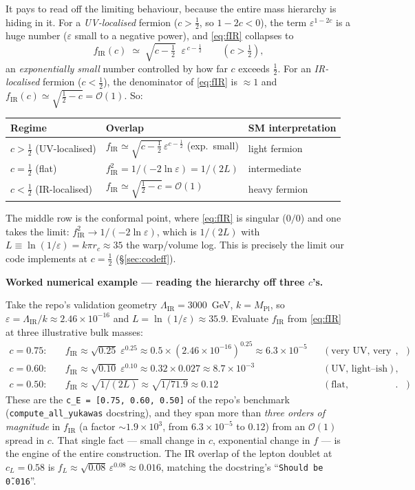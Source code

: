 \documentclass[11pt]{article}
\newenvironment{callout}[1]{%
  \par\medskip\begin{shaded}\noindent\textbf{#1}\par\smallskip}{\end{shaded}\medskip}
\newcommand{\LIR}{\Lambda_{\mathrm{IR}}}
\newcommand{\half}{\tfrac{1}{2}}
\newcommand{\eps}{\varepsilon}
\newcommand{\fIR}{f_{\mathrm{IR}}}
\newcommand{\Mpl}{M_{\mathrm{Pl}}}
\newcommand{\code}[1]{\texttt{#1}}
\theoremstyle{definition}
\begin{document}
It pays to read off the limiting behaviour, because the entire mass hierarchy is
hiding in it. For a \emph{UV-localised} fermion ($c>\half$, so $1-2c<0$), the term
$\eps^{1-2c}$ is a huge number ($\eps$ small to a negative power), and
\eqref{eq:fIR} collapses to
\begin{equation}
\fIR(c)\;\simeq\;\sqrt{c-\half}\;\;\eps^{\,c-\half}\qquad (c>\half),
\label{eq:fIRlimit}
\end{equation}
an \emph{exponentially small} number controlled by how far $c$ exceeds $\half$.
For an \emph{IR-localised} fermion ($c<\half$), the denominator of \eqref{eq:fIR}
is $\approx 1$ and $\fIR(c)\simeq\sqrt{\half-c}=\mathcal{O}(1)$. So:
\begin{center}
\begin{tabular}{lll}
\toprule
Regime & Overlap & SM interpretation \\
\midrule
$c>\half$ (UV-localised) & $\fIR\simeq\sqrt{c-\half}\,\eps^{c-\half}$ (exp.\ small) & light fermion \\
$c=\half$ (flat) & $\fIR^2 = 1/(-2\ln\eps) = 1/(2L)$ & intermediate \\
$c<\half$ (IR-localised) & $\fIR\simeq\sqrt{\half-c}=\mathcal{O}(1)$ & heavy fermion \\
\bottomrule
\end{tabular}
\end{center}
The middle row is the conformal point, where \eqref{eq:fIR} is singular ($0/0$)
and one takes the limit: $\fIR^2\to 1/(-2\ln\eps)$, which is $1/(2L)$ with
$L\equiv\ln(1/\eps)=k\pi r_c\approx 35$ the warp/volume log. This is precisely the
limit our code implements at $c=\half$ (\S\ref{sec:codeff}).

\begin{callout}{Worked numerical example --- reading the hierarchy off three $c$'s.}
Take the repo's validation geometry $\LIR=3000$~GeV, $k=\Mpl$, so
$\eps=\LIR/k\approx2.46\times10^{-16}$ and $L=\ln(1/\eps)\approx35.9$. Evaluate
$\fIR$ from \eqref{eq:fIR} at three illustrative bulk masses:
\begin{align*}
c=0.75:&\quad \fIR \approx \sqrt{0.25}\;\eps^{0.25}\approx 0.5\times(2.46\times10^{-16})^{0.25}\approx 6.3\times10^{-5}
   &&(\text{very UV, very light}),\\
c=0.60:&\quad \fIR \approx \sqrt{0.10}\;\eps^{0.10}\approx 0.32\times 0.027 \approx 8.7\times10^{-3}
   &&(\text{UV, light--ish}),\\
c=0.50:&\quad \fIR \approx \sqrt{1/(2L)}\approx \sqrt{1/71.9}\approx 0.12
   &&(\text{flat, intermediate}).
\end{align*}
These are the \code{c\_E = [0.75, 0.60, 0.50]} of the repo's benchmark
(\code{compute\_all\_yukawas} docstring), and they span more than \emph{three
orders of magnitude} in $\fIR$ (a factor $\sim1.9\times10^{3}$, from
$6.3\times10^{-5}$ to $0.12$) from an $\mathcal{O}(1)$ spread in $c$. That single fact ---
small change in $c$, exponential change in $f$ --- is the engine of the entire
construction. The IR overlap of the lepton doublet at $c_L=0.58$ is
$f_L\approx\sqrt{0.08}\,\eps^{0.08}\approx 0.016$, matching the docstring's
``\code{Should be \~0.016}''.
\end{callout}
\end{document}
